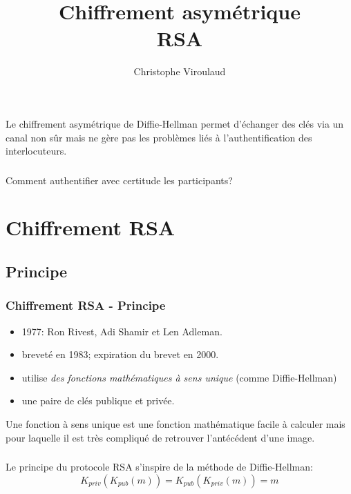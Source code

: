 \documentclass[svgnames,11pt]{beamer}
\author[]{Christophe Viroulaud}
\title{Chiffrement asymétrique\\RSA}
\date{\framebox{\textbf{Archi 23}}}
\institute{Terminale - NSI}
\begin{document}
\begin{frame}
\titlepage
\end{frame}
\begin{frame}

    Le chiffrement asymétrique de Diffie-Hellman permet d'échanger des clés via un canal non sûr mais ne gère pas les problèmes liés à l'authentification des interlocuteurs.

\end{frame}
\begin{frame}
    \frametitle{}

    \begin{framed}
        \centering Comment authentifier avec certitude les participants?
    \end{framed}
\end{frame}
\section{Chiffrement RSA}
\subsection{Principe}
\begin{frame}
    \frametitle{Chiffrement RSA - Principe}
\begin{itemize}
    \item 1977: Ron Rivest, Adi Shamir et Len Adleman. 
    \item breveté en 1983; expiration du brevet en 2000.
    \item utilise \emph{des fonctions mathématiques à sens unique} (comme Diffie-Hellman)
    \item une paire de clés publique et privée.

\end{itemize}  
\begin{aretenir}[]
Une fonction à sens unique est une fonction mathématique facile à calculer mais pour laquelle il est très compliqué de retrouver l'antécédent d'une image.
\end{aretenir}
\end{frame}

\begin{frame}
    \frametitle{}

    \begin{aretenir}[]
    Le principe du protocole RSA s'inspire de la méthode de Diffie-Hellman:
        {\Large$$K_{priv}(K_{pub}(m))=K_{pub}(K_{priv}(m))=m$$}
    \end{aretenir}
\end{frame}
\newcommand{\puzzle}[3]{
    \draw[fill=white] (#1-0.6,#2) -- (#1-0.6,0.7+#2) -- (1+#1,0.7+#2) arc (220:-40:0.3) -- (3.1+#1,0.7+#2) -- (3.1+#1,#2) -- cycle;
    \node at(#1+1.25,0.35+#2){#3};
    }
\newcommand{\puzzlebis}[3]{
    \draw (#1-0.6,1.9+#2) -- (#1-0.6,0.7+#2) -- (1+#1,0.7+#2) arc (220:-40:0.3) -- (3.1+#1,0.7+#2) -- (3.1+#1,1.9+#2) -- cycle;
    \node at(#1+1.25,1.55+#2){#3};
    }
\end{document}
